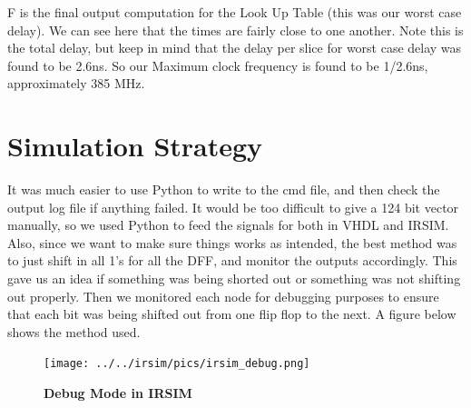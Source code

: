 \documentclass[a4paper]{article}
\begin{document}
    F is the final output computation for the Look Up Table (this was our worst case delay). We can see here that the times
    are fairly close to one another. Note this is the total delay, but keep in mind that the delay per slice for worst case
    delay was found to be 2.6ns. So our Maximum clock frequency is found to be 1/2.6ns, approximately 385 MHz.


\section{\textbf{Simulation Strategy}}
    It was much easier to use Python to write to the cmd file, and then check the output log file if anything failed.
    It would be too difficult to give a 124 bit vector manually, so we used Python to feed the signals for both in
    VHDL and IRSIM. Also, since we want to make sure things works as intended, the best method was to just shift in
    all 1's for all the DFF, and monitor the outputs accordingly. This gave us an idea if something was being shorted out
    or something was not shifting out properly. Then we monitored each node for debugging purposes to ensure that each bit
    was being shifted out from one flip flop to the next. A figure below shows the method used.

    \begin{figure}[H]
        \centering
        \texttt{[image: ../../irsim/pics/irsim\_debug.png]}
        \caption{\textbf{Debug Mode in IRSIM}}
        \label{fig:gg}
    \end{figure}
\end{document}
